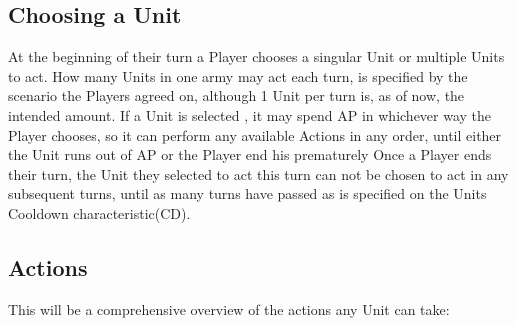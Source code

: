 \documentclass[a4paper,12pt]{report}
\begin{document}
\subsection{Choosing a Unit}
At the beginning of their turn a Player chooses a singular Unit or multiple Units to act. How many Units in one army may act each turn, is specified by the scenario the Players agreed on, although 1 Unit per turn is, as of now, the intended amount. If a Unit is selected , it may spend AP in whichever way the Player chooses, so it can perform any available Actions in any order, until either the Unit runs out of AP or the Player end his prematurely Once a Player ends their turn, the Unit they selected to act this turn can not be chosen to act in any subsequent turns, until as many turns have passed as is specified on the Units Cooldown characteristic(CD).\\

\subsection{Actions}

This will be a comprehensive overview of the actions any Unit can take:
\end{document}
